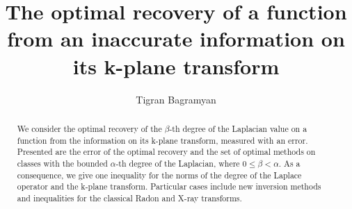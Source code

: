 \documentclass[12pt]{iopart}
\begin{document}
	
	\title[The optimal recovery of a function from its inaccurate k-plane transform]{The optimal recovery of a function from an inaccurate information on its k-plane transform}
	\author{Tigran Bagramyan}
	\begin{abstract}
		
		We consider the optimal recovery of the $\beta$-th degree of the Laplacian value on a function from the information on its k-plane transform, measured with an error. Presented are the error of the optimal recovery and the set of optimal methods on classes with the bounded $\alpha$-th degree of the Laplacian, where $0\leqslant\beta<\alpha$. As a consequence, we give one inequality for the norms of the degree of the Laplace operator and the k-plane transform. Particular cases include new inversion methods and inequalities for the classical Radon and X-ray transforms.
		
	\end{abstract}
	\maketitle
	
\end{document}
